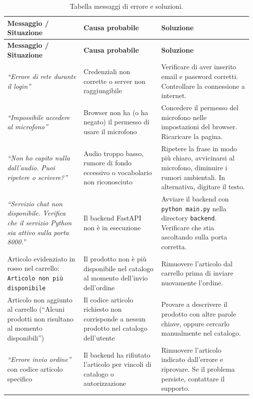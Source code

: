 \documentclass[a4paper, 11pt, oneside]{scrartcl}
\begin{document}
\begin{longtable}{|p{4cm}|p{4cm}|p{5.5cm}|}
    \caption{Tabella messaggi di errore e soluzioni.}
    \label{tab:errori} \\
    \hline
    \rowcolor{gray!10} \textbf{Messaggio / Situazione} & \textbf{Causa probabile} & \textbf{Soluzione} \\
    \hline
    \endfirsthead
    \hline
    \rowcolor{gray!10} \textbf{Messaggio / Situazione} & \textbf{Causa probabile} & \textbf{Soluzione} \\
    \hline
    \endhead
    \hline
    \endfoot

    \textit{``Errore di rete durante il login''} & Credenziali non corrette o server non raggiungibile & Verificare di aver inserito email e password corretti. Controllare la connessione a internet. \\
    \hline
    \textit{``Impossibile accedere al microfono''} & Browser non ha (o ha negato) il permesso di usare il microfono & Concedere il permesso del microfono nelle impostazioni del browser. Ricaricare la pagina. \\
    \hline
    \textit{``Non ho capito nulla dall'audio. Puoi ripetere o scrivere?''} & Audio troppo basso, rumore di fondo eccessivo o vocabolario non riconosciuto & Ripetere la frase in modo pi\`u chiaro, avvicinarsi al microfono, diminuire i rumori ambientali. In alternativa, digitare il testo. \\
    \hline
    \textit{``Servizio chat non disponibile. Verifica che il servizio Python sia attivo sulla porta 8000.''} & Il backend FastAPI non \`e in esecuzione & Avviare il backend con \texttt{python main.py} nella directory \texttt{backend}. Verificare che stia ascoltando sulla porta corretta. \\
    \hline
    Articolo evidenziato in rosso nel carrello: \texttt{Articolo non pi\`u disponibile} & Il prodotto non \`e pi\`u disponibile nel catalogo al momento dell'invio dell'ordine & Rimuovere l'articolo dal carrello prima di inviare nuovamente l'ordine. \\
    \hline
    Articolo non aggiunto al carrello (``Alcuni prodotti non risultano al momento disponibili'') & Il codice articolo richiesto non corrisponde a nessun prodotto nel catalogo dell'utente & Provare a descrivere il prodotto con altre parole chiave, oppure cercarlo manualmente nel catalogo. \\
    \hline
    \textit{``Errore invio ordine''} con codice articolo specifico & Il backend ha rifiutato l'articolo per vincoli di catalogo o autorizzazione & Rimuovere l'articolo indicato dall'errore e riprovare. Se il problema persiste, contattare il supporto. \\

\end{longtable}
\end{document}
